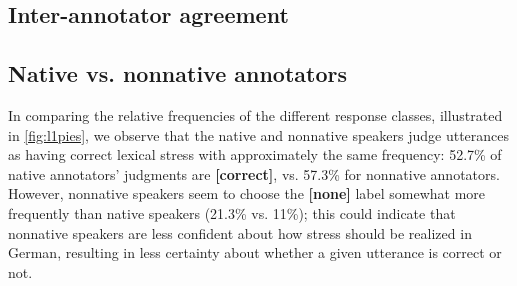 		
		
		\subsection{Inter-annotator agreement}
		\label{sec:results:agreement}
		
		\TODO{}
	
	
	
		\subsection{Native vs. nonnative annotators}
		\label{sec:results:native}
		
		

		In comparing the relative frequencies of the different response classes, illustrated in \cref{fig:l1pies}, we observe that the native and nonnative speakers judge utterances as having correct lexical stress with approximately the same frequency: 52.7\% of native annotators' judgments are \textbf{[correct]}, vs. 57.3\% for nonnative annotators. However, nonnative speakers seem to choose the \textbf{[none]}
		label somewhat more frequently than native speakers (21.3\% vs. 11\%); this could indicate that nonnative speakers are less confident about how stress should be realized in German, resulting in less certainty about whether a given utterance is correct or not. 
		
